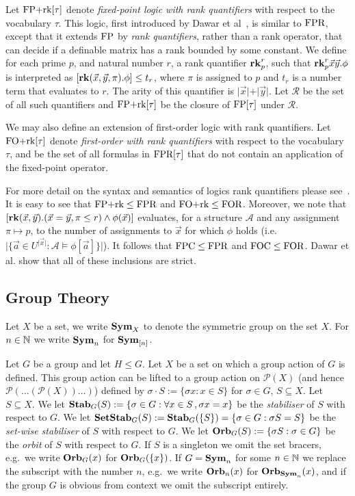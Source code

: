 \documentclass[../paper.tex]{subfiles}
\begin{document}
Let $\text{\upshape FP+rk}[\tau]$ denote \emph{fixed-point logic with rank quantifiers} with
respect to the vocabulary $\tau$. This logic, first introduced by Dawar et
al~\cite{Dawar09logicswith}, is similar to $\text{\upshape FPR}$, except that it extends $\text{\upshape FP}$
by \emph{rank quantifiers}, rather than a rank operator, that can decide if a
definable matrix has a rank bounded by some constant. We define for each prime
$p$, and natural number $r$, a rank quantifier $\text{\textbf{rk}}^r_p$, such that
$\text{\textbf{rk}}^r_p\vec{x}\vec{y}. \phi$ is interpreted as $[\text{\textbf{rk}} (\vec{x}, \vec{y},
\pi) . \phi] \leq t_r$, where $\pi$ is assigned to $p$ and $t_r$ is a number
term that evaluates to $r$. The arity of this quantifier is $\vert \vec{x} \vert
+ \vert \vec{y} \vert$. Let $\mathcal{R}$ be the set of all such quantifiers and
$\text{\upshape FP+rk}[\tau]$ be the closure of $\text{\upshape FP}[\tau]$ under $\mathcal{R}$.

We may also define an extension of first-order logic with rank quantifiers. Let
$\text{\upshape FO+rk}[\tau]$ denote \emph{first-order with rank quantifiers} with respect to
the vocabulary $\tau$, and be the set of all formulas in $\text{\upshape FPR}[\tau]$ that do
not contain an application of the fixed-point operator.

For more detail on the syntax and semantics of logics rank quantifiers please
see~\cite{Dawar09logicswith}. It is easy to see that $\text{\upshape FP+rk} \leq \text{\upshape FPR}$ and
$\text{\upshape FO+rk} \leq \text{\upshape FOR}$. Moreover, we note that $[\text{\textbf{rk}}(\vec{x}, \vec{y}).
(\vec{x} = \vec{y}, \pi \leq r) \land \phi(\vec{x})]$ evaluates, for a structure
$\mathcal{A}$ and any assignment $\pi \mapsto p$, to the number of assignments
to $\vec{x}$ for which $\phi$ holds (i.e.\ $\vert \{\vec{a} \in U^{\vert \vec{x}
  \vert} : \mathcal{A} \models \phi[\vec{a}]\} \vert$). It follows that $\text{\upshape FPC}
\leq \text{\upshape FPR}$ and $\text{\upshape FOC} \leq \text{\upshape FOR}$. Dawar et al.\cite{Dawar09logicswith} show that
all of these inclusions are strict.

\subsection{Group Theory}
Let $X$ be a set, we write $\text{\textbf{Sym}}_X$ to denote the symmetric group on the set
$X$. For $n \in \mathbb{N}$ we write $\text{\textbf{Sym}}_n$ for $\text{\textbf{Sym}}_{[n]}$.

Let $G$ be a group and let $H \leq G$. Let $X$ be a set on which a group action
of $G$ is defined. This group action can be lifted to a group action on
$\mathcal{P}(X)$ (and hence $\mathcal{P}(\ldots(\mathcal{P}(X))\ldots)$) defined
by $\sigma \cdot S := \{\sigma x : x \in S\}$ for $\sigma \in G$, $S \subseteq
X$. Let $S \subseteq X$. We let $\text{\textbf{Stab}}_G(S) := \{\sigma \in G : \forall x \in S
\,, \sigma x = x\}$ be the \emph{stabiliser} of $S$ with respect to $G$. We let
$\text{\textbf{SetStab}}_G(S) := \text{\textbf{Stab}}_G(\{S\}) = \{\sigma \in G : \sigma S = S\}$ be the
\emph{set-wise stabiliser} of $S$ with respect to $G$. We let $\text{\textbf{Orb}}_G(S) :=
\{\sigma S : \sigma \in G\}$ be the \emph{orbit} of $S$ with respect to $G$. If
$S$ is a singleton we omit the set bracers, e.g.\ we write $\text{\textbf{Orb}}_G(x)$ for
$\text{\textbf{Orb}}_G(\{x\})$. If $G = \text{\textbf{Sym}}_n$ for some $n \in \mathbb{N}$ we replace the subscript
with the number $n$, e.g.\ we write $\text{\textbf{Orb}}_n(x)$ for $\text{\textbf{Orb}}_{\text{\textbf{Sym}}_n}(x)$, and if
the group $G$ is obvious from context we omit the subscript entirely.
\end{document}
